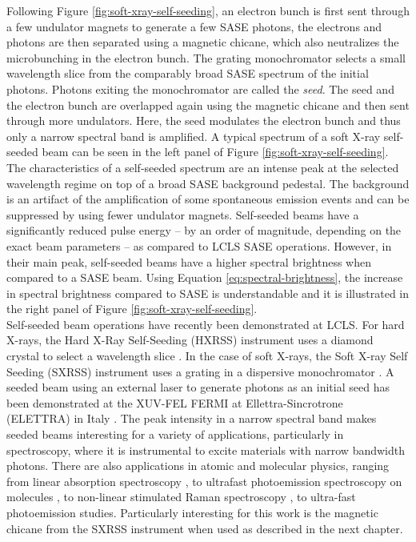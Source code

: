 Following Figure \ref{fig:soft-xray-self-seeding}, an electron bunch is first sent through a few undulator magnets to generate a few SASE photons, the electrons and photons are then separated using a magnetic chicane, which also neutralizes the microbunching in the electron bunch. The grating monochromator selects a small wavelength slice from the comparably broad SASE spectrum of the initial photons. Photons exiting the monochromator are called the \textit{seed}. The seed and the electron bunch are overlapped again using the magnetic chicane and then sent through more undulators. Here, the seed modulates the electron bunch and thus only a narrow spectral band is amplified. A typical spectrum of a soft X-ray self-seeded beam can be seen in the left panel of Figure \ref{fig:soft-xray-self-seeding}. The characteristics of a self-seeded spectrum are an intense peak at the selected wavelength regime on top of a broad SASE background pedestal. The background is an artifact of the amplification of some spontaneous emission events and can be suppressed by using fewer undulator magnets. Self-seeded beams have a significantly reduced pulse energy -- by an order of magnitude, depending on the exact beam parameters -- as compared to LCLS SASE operations. However, in their main peak, self-seeded beams have a higher spectral brightness when compared to a SASE beam. Using Equation \eqref{eq:spectral-brightness}, the increase in spectral brightness compared to SASE is understandable and it is illustrated in the right panel of Figure \ref{fig:soft-xray-self-seeding}.\\[1\baselineskip]
%
Self-seeded beam operations have recently been demonstrated at LCLS. For hard X-rays, the Hard X-Ray Self-Seeding (HXRSS) instrument uses a diamond crystal to select a wavelength slice \citep{Amann-2012-NatPho}. In the case of soft X-rays, the Soft X-ray Self Seeding (SXRSS) instrument uses a grating in a dispersive monochromator \citep{Ratner-2015-PRL}. A seeded beam using an external laser to generate photons as an initial seed has been demonstrated at the XUV-FEL FERMI at Ellettra-Sincrotrone (ELETTRA) in Italy \citep{Allaria-2012-NatPho}. The peak intensity in a narrow spectral band makes seeded beams interesting for a variety of applications, particularly in spectroscopy, where it is instrumental to excite materials with narrow bandwidth photons. There are also applications in atomic and molecular physics, ranging from linear absorption spectroscopy \citep{Ferguson-2014-Unpublished}, to ultrafast photoemission spectroscopy on molecules \citep{Bucher-2014-Unpublished}, to non-linear stimulated Raman spectroscopy \citep{Kimberg-2016-FD}, to ultra-fast photoemission studies. Particularly interesting for this work is the magnetic chicane from the SXRSS instrument when used as described in the next chapter.
%
%
%
%
